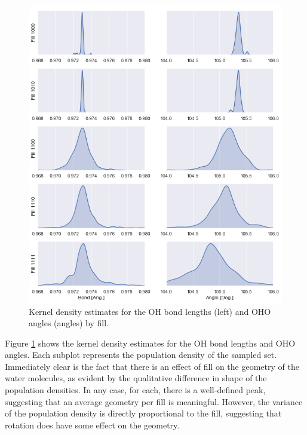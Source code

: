         \begin{figure}
            \centering
            \includegraphics[width=0.85\linewidth]{Figures/System/geom_kdes.png}
            \caption{Kernel density estimates for the OH bond lengths (left) and OHO angles (angles) by fill. }
            \label{fig:geom_kdes}
        \end{figure}
        
        Figure \ref{fig:geom_kdes} shows the kernel density estimates for the OH bond lengths and OHO angles. Each subplot represents the population density of the sampled set. Immediately clear is the fact that there is an effect of fill on the geometry of the water molecules, as evident by the qualitative difference in shape of the population densities. In any case, for each, there is a well-defined peak, suggesting that an average geometry per fill is meaningful. However, the variance of the population density is directly proportional to the fill, suggesting that rotation does have some effect on the geometry. 
        
        
        
